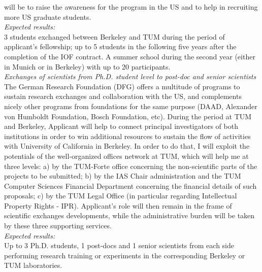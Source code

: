 will be to raise  the awareness for the program in the  US and to help
in recruiting more US graduate students.\\
\emph{Expected results:}\\
 3 students exchanged between Berkeley and TUM during
the period of  applicant's fellowship; up to 5 students  in the following five
years after the completion of the IOF contract. A summer school during
the  second year  (either in  Munich or  in Berkeley)  with up  to 20
participants. \\  
\emph{Exchanges of  scientists from  Ph.D. student  level to
post-doc and  senior scientists}\\
 The German Research  Foundation (DFG) offers  a multitude  of  programs to  sustain  research exchanges  and
collaboration with the US,  and complements nicely other programs from
foundations  for  the  same  purpose  (DAAD,  Alexander  von  Humboldt
Foundation, Bosch Foundation, etc). During  the period at TUM and Berkeley, 
Applicant will help to connect principal  investigators of both institutions in order
to win  additional resources  to sustain the  flow of  activities with
University  of California in  Berkeley. In  order to  do that,  I will
exploit the  potentials of  the well-organized offices  network at
TUM, which  will help me at  three levels: a) by  the TUM-Forte office
concerning the  non-scientific parts of the projects  to be submitted;
b)  by the  IAS Chair  administration and  the TUM  Computer Sciences
Financial  Department   concerning  the  financial   details  of  such
proposals;  c)  by  the  TUM  Legal Office  (in  particular  regarding
Intellectual Property Rights  - IPR). Applicant's role will  then remain in the
frame of  scientific exchanges developments,  while the administrative
burden  will be taken  by these  three supporting  services.\\
\emph{Expected results:}\\
Up  to 3  Ph.D. students, 1  post-docs and 1  senior scientists
from  each side  performing research  training or  experiments  in the
corresponding   Berkeley   or   TUM laboratories.  

